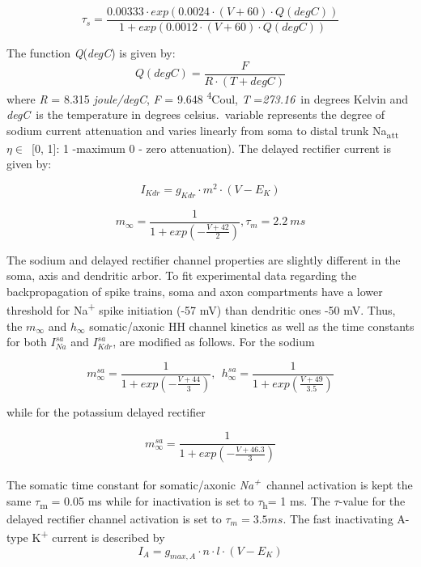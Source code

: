 \documentclass[12pt]{article}
\begin{document}
\begin{equation}
\tau_s=\frac{0.00333\cdot  exp(0.0024 \cdot (V+60)\cdot
		Q(degC))}{1+exp(0.0012 \cdot (V+60)\cdot Q(degC))}
\end{equation}

The function \textit{Q}(\textit{degC}) is given by:
\begin{equation}
Q(degC)= \frac{F}{ R \cdot (T+degC) }
\end{equation}
where \textit{R }=\textit{ }8.315\textit{ joule/degC}, \textit{F }=\textit{ }9.648\textit{ }\textsuperscript{4}Coul,
\textit{T }=\textit{273.16}~in degrees Kelvin and \textit{degC}~is the temperature in degrees celsius.~variable represents the degree of sodium current
attenuation and varies linearly from soma to distal trunk
Na\textsubscript{att} $\eta \in$~[0, 1]: 1 -maximum 0 - zero attenuation). The delayed rectifier current is given by:

\begin{equation}
I_{Kdr} = g_{Kdr} \cdot m^2 \cdot (V-E_K)
\end{equation}

\begin{equation}
m_{\infty}=\frac{1}{1+exp(-\frac{V+42}{2})}, \tau_m = 2.2 \ ms
\end{equation}

The sodium and delayed rectifier channel properties are slightly different in the soma, axis and dendritic arbor. To fit
experimental data regarding the backpropagation of spike trains, soma and axon compartments have a lower threshold for
Na\textsuperscript{+} spike initiation (-57 mV) than dendritic ones -50 mV. Thus, the $m_{\infty}$ and $h_{\infty}$
somatic/axonic HH channel kinetics as well as the time constants for both $I_{Na}^{sa}$ and $I_{Kdr}^{sa}$, are modified as follows. For the sodium

\begin{equation}
m_{\infty}^{sa}=\frac {1}{1+exp(-\frac{V+44}{3})} ,\ \ 
h_{\infty}^{sa}=\frac {1}{1+exp(\frac{V+49}{3.5})}
\end{equation}

while for the potassium delayed rectifier

\begin{equation}
m_{\infty}^{sa}=\frac {1}{1+exp(-\frac{V+46.3}{3})}
\end{equation}

The somatic time constant for somatic/axonic \textit{Na}\textit{\textsuperscript{+}}~channel activation is kept the
same $\tau$\textsubscript{m} = 0.05 ms while for inactivation is set to $\tau$\textsubscript{h}= 1 ms. The $\tau$-value for the delayed rectifier channel activation is set to $\tau_{m}= 3.5 ms$.
The fast inactivating A-type K\textsuperscript{+ }current is described by
\begin{equation}
I_A = g_{max, A} \cdot n \cdot l \cdot (V - E_K)
\end{equation}
\end{document}
